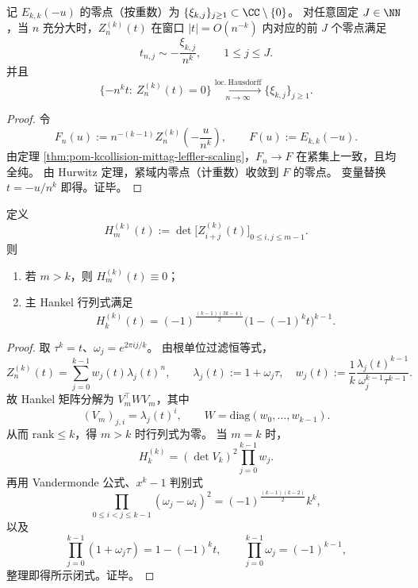 \begin{corollary}\label{cor:pom-kcollision-lee-yang-scaling}
记 \(E_{k,k}(-u)\) 的零点（按重数）为 \(\{\xi_{k,j}\}_{j\ge 1}\subset\CC\setminus\{0\}\)。
对任意固定 \(J\in\NN\)，当 \(n\) 充分大时，\(Z_n^{(k)}(t)\) 在窗口 \(|t|=O(n^{-k})\) 内对应的前 \(J\) 个零点满足
\[
t_{n,j}\sim -\frac{\xi_{k,j}}{n^k},\qquad 1\le j\le J.
\]
并且
\[
\{-n^k t:\ Z_n^{(k)}(t)=0\}\xrightarrow[n\to\infty]{\mathrm{loc.\ Hausdorff}}\{\xi_{k,j}\}_{j\ge 1}.
\]
\end{corollary}
\begin{proof}
令
\[
F_n(u):=n^{-(k-1)}Z_n^{(k)}\!\left(-\frac{u}{n^k}\right),\qquad F(u):=E_{k,k}(-u).
\]
由定理 \ref{thm:pom-kcollision-mittag-leffler-scaling}，\(F_n\to F\) 在紧集上一致，且均全纯。
由 Hurwitz 定理，紧域内零点（计重数）收敛到 \(F\) 的零点。
变量替换 \(t=-u/n^k\) 即得。证毕。
\end{proof}

\begin{proposition}\label{prop:pom-kcollision-hankel-fingerprint}
定义
\[
H_m^{(k)}(t):=\det\bigl[Z_{i+j}^{(k)}(t)\bigr]_{0\le i,j\le m-1}.
\]
则
\begin{enumerate}
\item 若 \(m>k\)，则 \(H_m^{(k)}(t)\equiv 0\)；
\item 主 Hankel 行列式满足
\[
H_k^{(k)}(t)=(-1)^{\frac{(k-1)(3k-4)}{2}}\bigl(1-(-1)^k t\bigr)^{k-1}.
\]
\end{enumerate}
\end{proposition}
\begin{proof}
取 \(\tau^k=t\)、\(\omega_j=e^{2\pi i j/k}\)。
由根单位过滤恒等式，
\[
Z_n^{(k)}(t)=\sum_{j=0}^{k-1}w_j(t)\lambda_j(t)^n,\qquad
\lambda_j(t):=1+\omega_j\tau,\quad
w_j(t):=\frac{1}{k}\frac{\lambda_j(t)^{k-1}}{\omega_j^{k-1}\tau^{k-1}}.
\]
故 Hankel 矩阵分解为 \(V_m^\top W V_m\)，其中
\[
(V_m)_{j,i}=\lambda_j(t)^i,\qquad
W=\mathrm{diag}(w_0,\dots,w_{k-1}).
\]
从而 \(\mathrm{rank}\le k\)，得 \(m>k\) 时行列式为零。
当 \(m=k\) 时，
\[
H_k^{(k)}=(\det V_k)^2\prod_{j=0}^{k-1}w_j.
\]
再用 Vandermonde 公式、\(x^k-1\) 判别式
\[
\prod_{0\le i<j\le k-1}(\omega_j-\omega_i)^2
=(-1)^{\frac{(k-1)(k-2)}{2}}k^k,
\]
以及
\[
\prod_{j=0}^{k-1}(1+\omega_j\tau)=1-(-1)^k t,\qquad
\prod_{j=0}^{k-1}\omega_j=(-1)^{k-1},
\]
整理即得所示闭式。证毕。
\end{proof}

